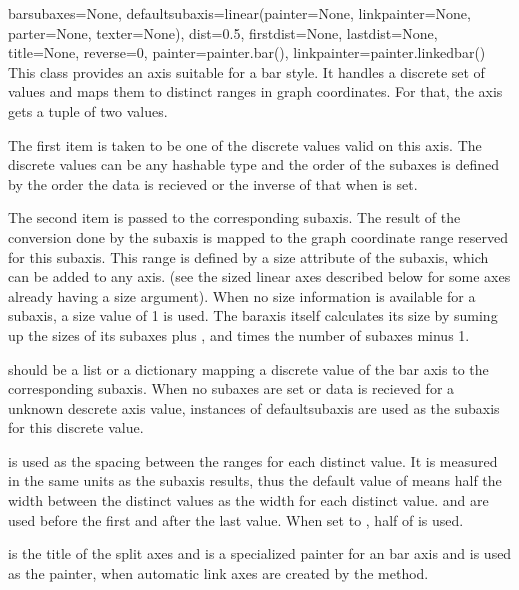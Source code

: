 \begin{classdesc}{bar}{subaxes=None,
                       defaultsubaxis=linear(painter=None,
                                             linkpainter=None,
                                             parter=None,
                                             texter=None),
                       dist=0.5, firstdist=None, lastdist=None,
                       title=None, reverse=0,
                       painter=painter.bar(),
                       linkpainter=painter.linkedbar()}
  This class provides an axis suitable for a bar style. It handles a
  discrete set of values and maps them to distinct ranges in graph
  coordinates. For that, the axis gets a tuple of two values.

  The first item is taken to be one of the discrete values valid on
  this axis. The discrete values can be any hashable type and the
  order of the subaxes is defined by the order the data is recieved or
  the inverse of that when  is set.

  The second item is passed to the corresponding subaxis. The result
  of the conversion done by the subaxis is mapped to the graph
  coordinate range reserved for this subaxis. This range is defined by
  a size attribute of the subaxis, which can be added to any axis.
  (see the sized linear axes described below for some axes already
  having a size argument). When no size information is available for a
  subaxis, a size value of 1 is used. The baraxis itself calculates
  its size by suming up the sizes of its subaxes plus ,
   and  times the number of subaxes minus 1.

   should be a list or a dictionary mapping a discrete
  value of the bar axis to the corresponding subaxis. When no subaxes
  are set or data is recieved for a unknown descrete axis value,
  instances of defaultsubaxis are used as the subaxis for this
  discrete value.

   is used as the spacing between the ranges for each
  distinct value. It is measured in the same units as the subaxis
  results, thus the default value of  means half the width
  between the distinct values as the width for each distinct value.
   and  are used before the first and
  after the last value. When set to , half of 
  is used.

   is the title of the split axes and  is a
  specialized painter for an bar axis and  is used as
  the painter, when automatic link axes are created by the
   method.
\end{classdesc}

